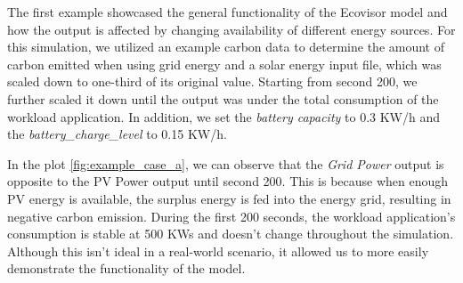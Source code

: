 \begin{figure*}
	\centering
	\caption{Showcase changing Energy Mix}
	\label{fig:example_case_a}
\end{figure*}



The first example showcased the general functionality of the Ecovisor model and how the output is affected by changing availability of different energy sources. For this simulation, we utilized an example carbon data to determine the amount of carbon emitted when using grid energy and a solar energy input file, which was scaled down to one-third of its original value. Starting from second 200, we further scaled it down until the output was under the total consumption of the workload application. In addition, we set the \textit{battery capacity} to 0.3 KW/h and the \textit{battery\_charge\_level} to 0.15 KW/h.

In the plot \ref{fig:example_case_a}, we can observe that the \textit{Grid Power} output is opposite to the PV Power output until second 200. This is because when enough PV energy is available, the surplus energy is fed into the energy grid, resulting in negative carbon emission. During the first 200 seconds, the workload application's consumption is stable at 500 KWs and doesn't change throughout the simulation. Although this isn't ideal in a real-world scenario, it allowed us to more easily demonstrate the functionality of the model.


